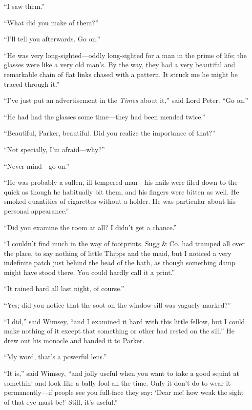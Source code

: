 \enquote{I saw them.}

\enquote{What did you make of them?}

\enquote{I’ll tell you afterwards. Go on.}

\enquote{He was very long-sighted\allowbreak---\allowbreak oddly long-sighted for a man in the prime of life; the glasses were like a very old man’s. By the way, they had a very beautiful and remarkable chain of flat links chased with a pattern. It struck me he might be traced through it.}

\enquote{I’ve just put an advertisement in the \textit{Times} about it,} said Lord Peter. \enquote{Go on.}

\enquote{He had had the glasses some time\allowbreak---\allowbreak they had been mended twice.}

\enquote{Beautiful, Parker, beautiful. Did you realize the importance of that?}

\enquote{Not specially, I’m afraid\allowbreak---\allowbreak why?}

\enquote{Never mind\allowbreak---\allowbreak go on.}

\enquote{He was probably a sullen, ill-tempered man\allowbreak---\allowbreak his nails were filed down to the quick as though he habitually bit them, and his fingers were bitten as well. He smoked quantities of cigarettes without a holder. He was particular about his personal appearance.}

\enquote{Did you examine the room at all? I didn’t get a chance.}

\enquote{I couldn’t find much in the way of footprints. Sugg \& Co. had tramped all over the place, to say nothing of little Thipps and the maid, but I noticed a very indefinite patch just behind the head of the bath, as though something damp might have stood there. You could hardly call it a print.}

\enquote{It rained hard all last night, of course.}

\enquote{Yes; did you notice that the soot on the window-sill was vaguely marked?}

\enquote{I did,} said Wimsey, \enquote{and I examined it hard with this little fellow, but I could make nothing of it except that something or other had rested on the sill.} He drew out his monocle and handed it to Parker.

\enquote{My word, that’s a powerful lens.}

\enquote{It is,} said Wimsey, \enquote{and jolly useful when you want to take a good squint at somethin’ and look like a bally fool all the time. Only it don’t do to wear it permanently\allowbreak---\allowbreak if people see you full-face they say: \enquote{Dear me! how weak the sight of that eye must be!} Still, it’s useful.}

